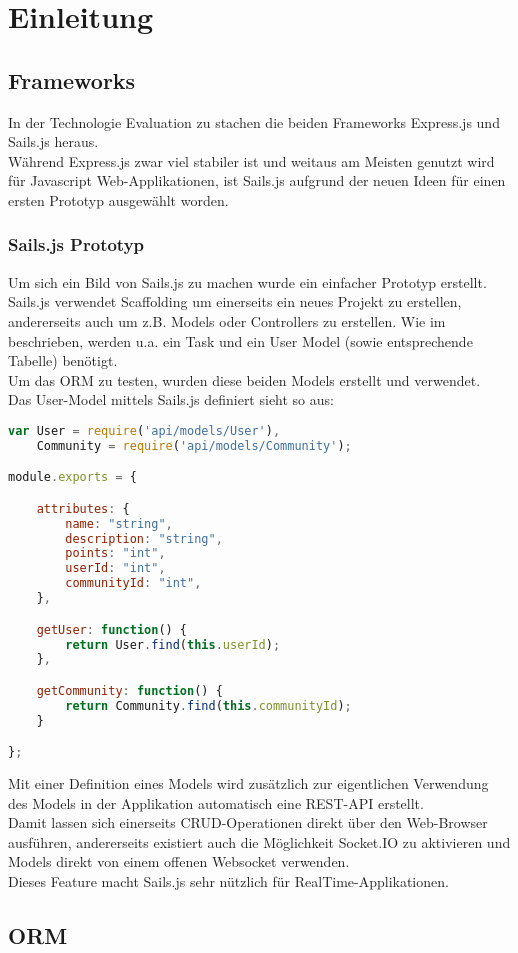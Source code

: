 \section{Einleitung}

\subsection*{Frameworks}
In der Technologie Evaluation zu  stachen die beiden Frameworks Express.js \cite{Expressjs}
und Sails.js \cite{sails} heraus.\\
Während Express.js zwar viel stabiler ist und weitaus am Meisten genutzt wird für Javascript Web-Applikationen, ist Sails.js aufgrund der neuen
Ideen für einen ersten Prototyp ausgewählt worden.

\subsubsection*{Sails.js Prototyp}
Um sich ein Bild von Sails.js zu machen wurde ein einfacher Prototyp \cite{SailsPrototyp} erstellt.\\[1mm]

Sails.js verwendet \gls{Scaffolding} um einerseits ein neues Projekt zu erstellen, andererseits auch um z.B. Models oder Controllers zu erstellen.
Wie im  beschrieben, werden u.a. ein Task und ein User Model (sowie entsprechende Tabelle) benötigt.\\
Um das \gls{ORM} zu testen, wurden diese beiden Models erstellt und verwendet.\\
Das User-Model mittels Sails.js definiert sieht so aus:\\

\begin{lstlisting}[language=JavaScript, caption=User Model in Sails.js]
var User = require('api/models/User'),
	Community = require('api/models/Community');

module.exports = {

	attributes: {
		name: "string",
		description: "string",
		points: "int",
		userId: "int",
		communityId: "int",
	},

	getUser: function() {
		return User.find(this.userId);
	},

	getCommunity: function() {
		return Community.find(this.communityId);
	}

};
\end{lstlisting}

Mit einer Definition eines Models wird zusätzlich zur eigentlichen Verwendung des Models in der Applikation automatisch eine \gls{REST}-API erstellt.\\
Damit lassen sich einerseits CRUD-Operationen direkt über den Web-Browser ausführen, andererseits existiert auch die Möglichkeit Socket.IO \cite{SocketIO} zu aktivieren und Models direkt von einem offenen \gls{Websocket} verwenden.\\
Dieses Feature macht Sails.js sehr nützlich für \gls{RealTime}-Applikationen.

\subsection*{\gls{ORM}}